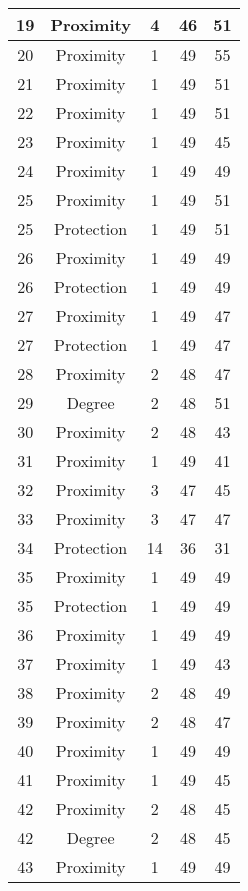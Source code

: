 \documentclass[results.tex]{subfiles}
\begin{document}
\begin{center}
\begin{tabular}{| c || c | c | c | c |}
    \hline
    19 & Proximity & 4 & 46 & 51 \\ 
    \hline
    20 & Proximity & 1 & 49 & 55 \\ 
    \hline
    21 & Proximity & 1 & 49 & 51 \\ 
    \hline
    22 & Proximity & 1 & 49 & 51 \\ 
    \hline
    23 & Proximity & 1 & 49 & 45 \\ 
    \hline
    24 & Proximity & 1 & 49 & 49 \\ 
    \hline
    25 & Proximity & 1 & 49 & 51 \\ 
    \hline
    25 & Protection & 1 & 49 & 51 \\ 
    \hline
    26 & Proximity & 1 & 49 & 49 \\ 
    \hline
    26 & Protection & 1 & 49 & 49 \\ 
    \hline
    27 & Proximity & 1 & 49 & 47 \\ 
    \hline
    27 & Protection & 1 & 49 & 47 \\ 
    \hline
    28 & Proximity & 2 & 48 & 47 \\ 
    \hline
    29 & Degree & 2 & 48 & 51 \\ 
    \hline
    30 & Proximity & 2 & 48 & 43 \\ 
    \hline
    31 & Proximity & 1 & 49 & 41 \\ 
    \hline
    32 & Proximity & 3 & 47 & 45 \\ 
    \hline
    33 & Proximity & 3 & 47 & 47 \\ 
    \hline
    34 & Protection & 14 & 36 & 31 \\ 
    \hline
    35 & Proximity & 1 & 49 & 49 \\ 
    \hline
    35 & Protection & 1 & 49 & 49 \\ 
    \hline
    36 & Proximity & 1 & 49 & 49 \\ 
    \hline
    37 & Proximity & 1 & 49 & 43 \\ 
    \hline
    38 & Proximity & 2 & 48 & 49 \\ 
    \hline
    39 & Proximity & 2 & 48 & 47 \\ 
    \hline
    40 & Proximity & 1 & 49 & 49 \\ 
    \hline
    41 & Proximity & 1 & 49 & 45 \\ 
    \hline
    42 & Proximity & 2 & 48 & 45 \\ 
    \hline
    42 & Degree & 2 & 48 & 45 \\ 
    \hline
    43 & Proximity & 1 & 49 & 49 \\ 

\end{tabular}
\end{center}
\end{document}

